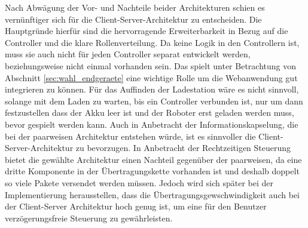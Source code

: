 Nach Abwägung der Vor- und Nachteile beider Architekturen schien es vernünftiger sich für die Client-Server-Architektur zu entscheiden. Die Hauptgründe hierfür sind die hervorragende Erweiterbarkeit in Bezug auf die Controller und die klare Rollenverteilung. Da keine Logik in den Controllern ist, muss sie auch nicht für jeden Controller separat entwickelt werden, beziehungsweise nicht einmal vorhanden sein. Das spielt unter Betrachtung von Abschnitt \ref{sec:wahl_endgeraete} eine wichtige Rolle um die Webanwendung gut integrieren zu können. Für das Auffinden der Ladestation wäre es nicht sinnvoll, solange mit dem Laden zu warten, bis ein Controller verbunden ist, nur um dann festzustellen dass der Akku leer ist und der Roboter erst geladen werden muss, bevor gespielt werden kann. Auch in Anbetracht der Informationskapselung, die bei der paarweisen Architektur entstehen würde, ist es sinnvoller die Client-Server-Architektur zu bevorzugen. In Anbetracht der Rechtzeitigen Steuerung bietet die gewählte Architektur einen Nachteil gegenüber der paarweisen, da eine dritte Komponente in der Übertragungskette vorhanden ist und deshalb doppelt so viele Pakete versendet werden müssen. Jedoch wird sich später bei der Implementierung herausstellen, dass die Übertragungsgewschwindigkeit auch bei der Client-Server Architektur hoch genug ist, um eine für den Benutzer verzögerungsfreie Steuerung zu gewährleisten.